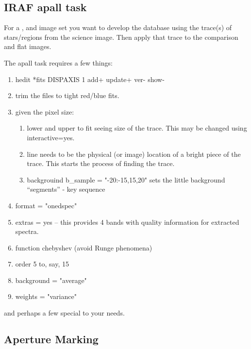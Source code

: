 \subsection{IRAF apall task}  \label{sec:apall}

\example For a ,  and  image set you
want to develop the database using the trace(s) of stars/regions from
the science image. Then apply that trace to the comparison and flat
images.

The apall task requires a few things:
\vspace{-.15cm}
\begin{enumerate}\addtolength{\itemsep}{-0.5\baselineskip}
   \item   hedit *fits DISPAXIS 1 add+ update+ ver- show-
   \item   trim the files to tight red/blue fits. 
   \item   given the pixel size:
\vspace{-.15cm}
\begin{enumerate}\addtolength{\itemsep}{-0.5\baselineskip}
   \item   lower and upper to fit seeing size of the trace. This may be changed
   using interactive=yes.
   \item   line needs to be the physical (or image) location of a bright piece of
   the trace. This starts the process of finding the trace.
   \item   backgrouind b\_sample = "-20:-15,15,20" sets the little background
   ``segments'' - key sequence
\end{enumerate}
   \item   format = "onedspec"
   \item   extras = yes -- this provides 4 bands with quality information for
           extracted spectra.
   \item   function chebyshev (avoid Runge phenomena)
   \item   order 5 to, say, 15
   \item   background = "average"
   \item   weights = "variance"
\end{enumerate}


and perhaps a few special to your needs.

\subsection{Aperture Marking}

